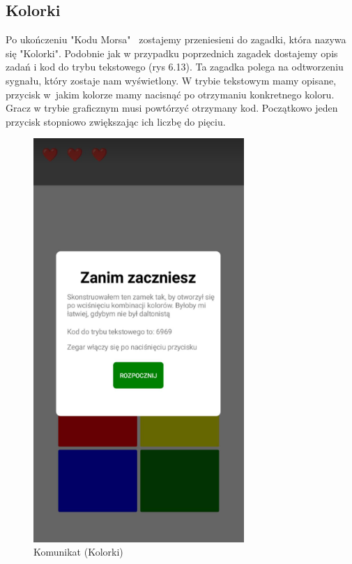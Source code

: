 \subsection{Kolorki}
Po ukończeniu "Kodu Morsa"~ zostajemy przeniesieni do zagadki, która nazywa się "Kolorki". Podobnie jak w przypadku poprzednich zagadek dostajemy opis zadań i kod do trybu tekstowego (rys 6.13). Ta zagadka polega na odtworzeniu sygnału, który zostaje nam wyświetlony. W trybie tekstowym mamy opisane, przycisk w~jakim kolorze mamy nacisnąć po otrzymaniu konkretnego koloru. Gracz w trybie graficznym musi powtórzyć otrzymany kod. Początkowo jeden przycisk stopniowo zwiększając ich liczbę do pięciu.
\\
	\begin{figure}[!htb]
	\begin{center}
		\includegraphics[width=8cm]{rys/opis9.png}
		\caption{Komunikat (Kolorki)}
		\label{rys:rysunek001}
	\end{center}
\end{figure}

